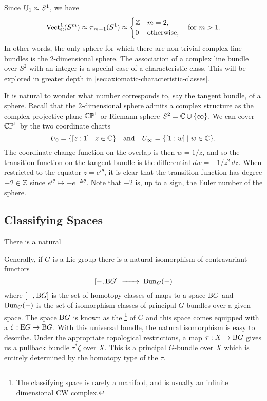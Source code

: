 \begin{example}
	Since $\mathrm{U}_1\approx S^1$, we have
	\[
		\operatorname{Vect}_{\mathbb{C}}^1(S^m) \approx \pi_{m-1}(S^1) \approx \begin{cases} \mathbb{Z} & m=2,\\ 0 & \textrm{otherwise},\end{cases}
		\quad\textrm{for }m >1.
	\]
	In other words, the only sphere for which there are non-trivial complex line bundles is the $2$-dimensional sphere. The association of a complex line bundle over $S^2$ with an integer is a special case of a characteristic class. This will be explored in greater depth in \cref{sec:axiomatic-characteristic-classes}.

	It is natural to wonder what number corresponds to, say the tangent bundle, of a sphere. Recall that the $2$-dimensional sphere admits a complex structure as the complex projective plane $\mathbb{CP}^1$ or Riemann sphere $S^2 = \mathbb{C}\cup\{\infty\}$. We can cover $\mathbb{CP}^1$ by the two coordinate charts
	\[
		U_0 = \{[z: 1] \mid z\in \mathbb{C}\}
		\quad\textrm{and}\quad
		U_\infty = \{[1: w] \mid w\in \mathbb{C}\}.
	\]
	The coordinate change function on the overlap is then $w=1/z$, and so the transition function on the tangent bundle is the differential $dw=-1/z^2 \,dz$. When restricted to the equator $z=e^{i\theta}$, it is clear that the transition function has degree $-2\in \mathbb{Z}$ since $e^{i\theta}\mapsto -e^{-2i\theta}$. Note that $-2$ is, up to a sign, the Euler number of the sphere.
\end{example}


\subsection{Classifying Spaces}\label{sec:classifying-spaces}

\begin{proposition}\label{prop:homotopy-invariance-vector-bundle}
	There is a natural
\end{proposition}

\begin{theorem}\label{thm:classifying-space}
\end{theorem}
Generally, if $G$ is a Lie group there is a natural isomorphism of contravariant functors
\[
	[-, \BB G] \lkxto \Bun_G(-)
\]
where $[-, \mathrm{B} G]$ is the set of homotopy classes of maps to a space $\mathrm{B} G$ and $\operatorname{Bun}_G(-)$ is the set of isomorphism classes of principal $G$-bundles over a given space.
The space $\mathrm{B} G$ is known as the \footnote{The classifying space is rarely a manifold, and is usually an infinite dimensional CW complex.} of $G$ and this space comes equipped with a  $\zeta : \mathrm{E} G \to \mathrm{B} G$. With this universal bundle, the natural isomorphism is easy to describe. Under the appropriate topological restrictions, a map $\tau : X \to \mathrm{B} G$ gives us a pullback bundle $\tau^*\zeta$ over $X$. This is a principal $G$-bundle over $X$ which is entirely determined by the homotopy type of the  $\tau$.

